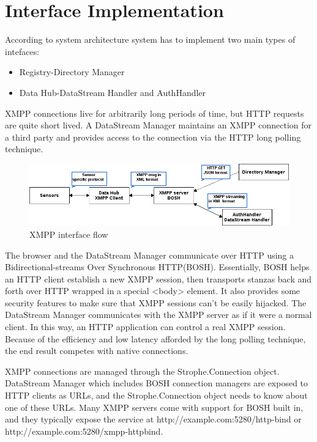 \section{Interface Implementation}
	 According to system architecture system has to implement two main types of intefaces:
	 \begin{itemize}
	 \item Registry-Directory Manager
	 \item Data Hub-DataStream Handler and AuthHandler
	 \end{itemize}
	 XMPP connections live for arbitrarily long periods of time, but HTTP requests are quite short lived.
	A DataStream Manager maintains an XMPP connection for a third party and provides access to the connection via the HTTP long polling technique.
	    \begin{figure}[!ht]
		\centering
		\includegraphics[scale=0.6]{images/XMPPflow.png}   
		\caption[XMPP BOSH/Stream]{XMPP interface flow}                      
		\end{figure}

	The browser and the DataStream Manager communicate over HTTP using a Bidirectional-streams Over Synchronous HTTP(BOSH). Essentially, BOSH helps an HTTP client establish a new XMPP session, then transports stanzas back and forth over HTTP wrapped in a special <body> element. It also provides some security features to make sure that XMPP sessions can't be easily hijacked. The DataStream Manager communicates with the XMPP server as if it were a normal client. In this way, an HTTP application can control a real XMPP session. Because of the efficiency and low latency afforded by the long polling technique, the end result competes with native connections.

	XMPP connections are managed through the Strophe.Connection object. DataStream Manager which includes BOSH connection managers are exposed to HTTP clients as URLs, and the Strophe.Connection object needs to know about one of these URLs. Many XMPP servers come with support for BOSH built in, and they typically expose the service at http://example.com:5280/http-bind or http://example.com:5280/xmpp-httpbind.

